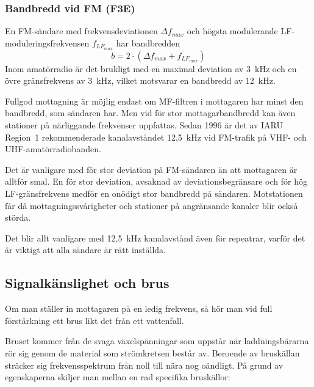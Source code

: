 \subsubsection{Bandbredd vid FM (F3E)}

En FM-sändare med frekvensdeviationen \(\Delta f_{max}\) och högsta
modulerande LF-moduleringsfrekvensen \(f_{LF_{max}}\) har bandbredden
\[ b = 2 \cdot (\Delta f_{max} + f_{LF_{max}}) \]
Inom amatörradio är det brukligt med en maximal deviation av 3~kHz och
en övre gränsfrekvens av 3~kHz, vilket motsvarar en bandbredd av 12~kHz.

Fullgod mottagning är möjlig endast om MF-filtren i mottagaren har
minst den bandbredd, som sändaren har.
Men vid för stor mottagarbandbredd kan även stationer på närliggande frekvenser
uppfattas.
Sedan 1996 är det av IARU Region~1 rekommenderade kanalavståndet 12,5~kHz
vid FM-trafik på VHF- och UHF-amatörradiobanden.

Det är vanligare med för stor deviation på FM-sändaren än att
mottagaren är alltför smal.
En för stor deviation, avsaknad av deviationsbegränsare och för hög
LF-gränsfrekvens medför en onödigt stor bandbredd på sändaren.
Motstationen får då mottagningssvårigheter och stationer på angränsande
kanaler blir också störda.

Det blir allt vanligare med 12,5~kHz kanalavstånd även för repeatrar,
varför det är viktigt att alla sändare är rätt inställda.

\subsection{Signalkänslighet och brus}

Om man ställer in mottagaren på en ledig frekvens, så hör man vid full
förstärkning ett brus likt det från ett vattenfall.

Bruset kommer från de svaga växelspänningar som uppstår när
laddningsbärarna rör sig genom de material som strömkretsen består av.
Beroende av bruskällan sträcker sig frekvensspektrum från noll
till nära nog oändligt.
På grund av egenskaperna skiljer man mellan en rad specifika bruskällor:

